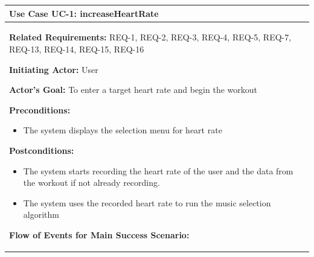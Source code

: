 \documentclass[letterpaper,english, 12pt]{scrreprt}
\begin{document}
\begin{center}
        \begin{tabular}{|C{15cm}|}
                \hline
                        \textbf{Use Case UC-1: increaseHeartRate}\\
                \hline
                        \begin{flushleft}
                                \textbf{Related Requirements: } REQ-1, REQ-2, REQ-3, REQ-4, REQ-5, REQ-7, REQ-13, REQ-14, REQ-15, REQ-16
                        \end{flushleft}
                        \begin{flushleft}
                                \textbf{Initiating Actor: } User
                        \end{flushleft}
                        \begin{flushleft}
                                \textbf{Actor's Goal: } To enter a target heart rate and begin the workout
                        \end{flushleft}
                        \begin{flushleft}
                                \textbf{Preconditions: }
                        \end{flushleft}
                                \begin{itemize}
                                        \item The system displays the selection menu for heart rate
                                \end{itemize}
                        \begin{flushleft}
                                \textbf{Postconditions: }
                        \end{flushleft}
                                \begin{itemize}
                                        \item The system starts recording the heart rate of the user and the data from the workout if not already recording.
                                        \item The system uses the recorded heart rate to run the music selection algorithm
                                \end{itemize}
                        \begin{flushleft}
                                \textbf{Flow of Events for Main Success Scenario: }
                        \end{flushleft}

\end{tabular}
\end{center}
\end{document}
